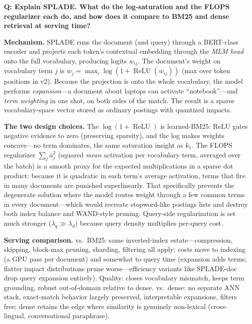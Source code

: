 \begin{interviewq}
\textbf{Q: Explain SPLADE. What do the log-saturation and the FLOPS regularizer each do, and how does it compare to BM25 and dense retrieval at serving time?}

 \quad {} \quad \badgefreq{\freqmed}

\stronganswer

\textbf{Mechanism.} SPLADE runs the document (and query) through a BERT-class encoder and projects each token's contextual embedding through the \emph{MLM head} onto the full vocabulary, producing logits $w_{ij}$. The document's weight on vocabulary term $j$ is $w_j = \max_i \log(1 + \operatorname{ReLU}(w_{ij}))$ (max over token positions in v2). Because the projection is onto the whole vocabulary, the model performs \emph{expansion}---a document about laptops can activate ``notebook''---and \emph{term weighting} in one shot, on both sides of the match. The result is a sparse vocabulary-space vector stored as ordinary postings with quantized impacts.

\textbf{The two design choices.} The $\log(1+\operatorname{ReLU})$ is learned-BM25: ReLU gates negative evidence to zero (preserving sparsity), and the log makes weights concave---no term dominates, the same saturation insight as $k_1$. The FLOPS regularizer $\sum_j \bar{a}_j^2$ (squared \emph{mean} activation per vocabulary term, averaged over the batch) is a smooth proxy for the expected multiplications in a sparse dot product: because it is quadratic in each term's average activation, terms that fire in many documents are punished superlinearly. That specifically prevents the degenerate solution where the model routes weight through a few common terms in every document---which would recreate stopword-like postings lists and destroy both index balance and WAND-style pruning. Query-side regularization is set much stronger ($\lambda_q \gg \lambda_d$) because query density multiplies per-query cost.

\textbf{Serving comparison.} vs.\ BM25: same inverted-index estate---compression, skipping, block-max pruning, sharding, filtering all apply; costs move to indexing (a GPU pass per document) and somewhat to query time (expansion adds terms; flatter impact distributions prune worse---efficiency variants like SPLADE-doc drop query expansion entirely). Quality: closes vocabulary mismatch, keeps term grounding, robust out-of-domain relative to dense. vs.\ dense: no separate ANN stack, exact-match behavior largely preserved, interpretable expansions, filters free; dense retains the edge where similarity is genuinely non-lexical (cross-lingual, conversational paraphrase).


\end{interviewq}
